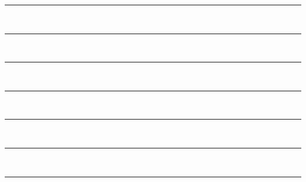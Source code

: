 \documentclass{article}
\theoremstyle{definition}
\theoremstyle{remark}
\begin{document}
 

\begin{titlepage} %

	\centering %
	
	\scshape %
	
	\vspace*{\baselineskip} %
	
	
	\rule{\textwidth}{1.6pt} \\ \vspace*{-\baselineskip}\vspace*{5pt} %
	\rule{12cm}{1.4pt} \\ \vspace*{-\baselineskip}\vspace*{4.8pt}
	\rule{11cm}{1.2pt} \\ \vspace*{-\baselineskip}\vspace*{4.6pt}%
	\rule{10cm}{1.0pt} \\ \vspace*{-\baselineskip}\vspace*{4.4pt}
	\rule{9cm}{0.8pt} \\ \vspace*{-\baselineskip}\vspace*{4.2pt}
	\rule{8cm}{0.6pt} \\ \vspace*{-\baselineskip}\vspace*{4.0pt}
	\rule{7cm}{0.4pt}%
	
	

\end{titlepage}
\end{document}
